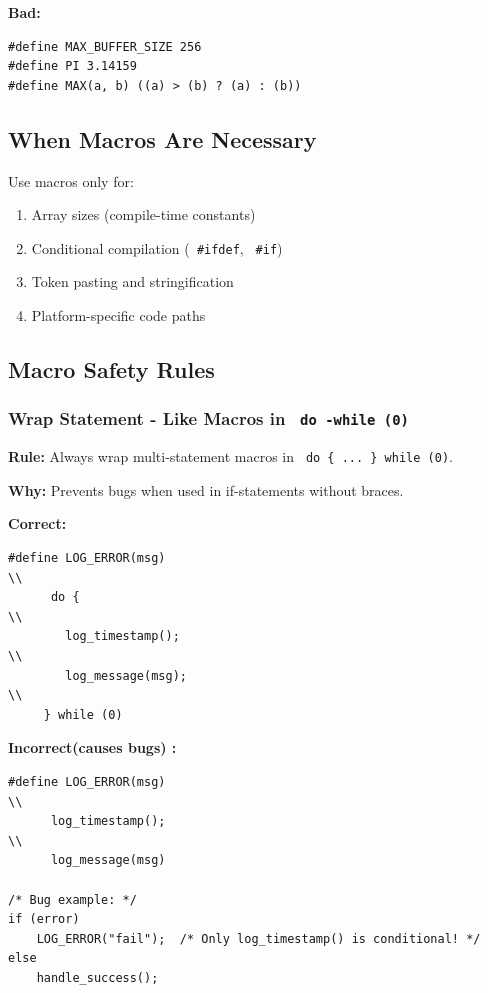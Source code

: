 \textbf{Bad:}
\begin{verbatim}
#define MAX_BUFFER_SIZE 256
#define PI 3.14159
#define MAX(a, b) ((a) > (b) ? (a) : (b))
\end{verbatim}

\subsection{When Macros Are Necessary}

Use macros only for:

\begin{enumerate}
    \item Array sizes (compile-time constants)
    \item Conditional compilation (\texttt{
      \#ifdef}, \texttt{
      \#if})
    \item Token pasting and stringification
    \item Platform-specific code paths
\end{enumerate}

\subsection{Macro Safety Rules}

\subsubsection{Wrap Statement - Like Macros in \texttt {
        do
          -while (0)
     }}

\textbf{Rule:} Always wrap multi-statement macros in \texttt{
      do
        \{ ... \}
      while (0)}.

\textbf{Why:} Prevents bugs when used in if-statements without braces.

\textbf{Correct:}
\begin{verbatim}
#define LOG_ERROR(msg)                                                    \\
      do {                                                                    \\
        log_timestamp();                                                      \\
        log_message(msg);                                                     \\
     } while (0)
\end{verbatim}

\textbf{Incorrect(causes bugs) :}
\begin{verbatim}
#define LOG_ERROR(msg)                                                    \\
      log_timestamp();                                                        \\
      log_message(msg)

/* Bug example: */
if (error)
    LOG_ERROR("fail");  /* Only log_timestamp() is conditional! */
else
    handle_success();
\end{verbatim}

